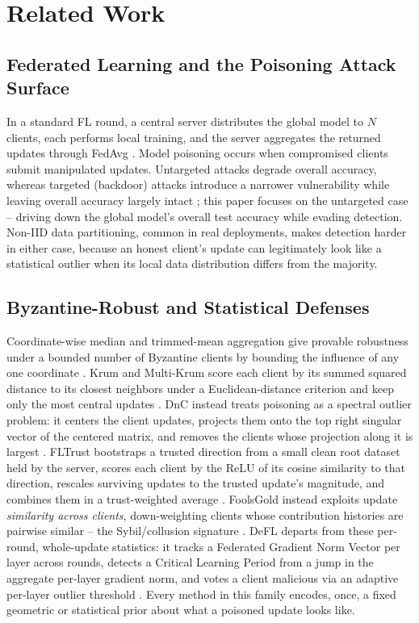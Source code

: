\documentclass[conference]{IEEEtran}
\begin{document}
\section{Related Work}
\label{sec:related}

\subsection{Federated Learning and the Poisoning Attack Surface}
In a standard FL round, a central server distributes the global model to $N$ clients, each performs local training, and the server aggregates the returned updates through FedAvg \cite{fedavg}. Model poisoning occurs when compromised clients submit manipulated updates. Untargeted attacks degrade overall accuracy, whereas targeted (backdoor) attacks introduce a narrower vulnerability while leaving overall accuracy largely intact \cite{bagdasaryan2020}; this paper focuses on the untargeted case -- driving down the global model's overall test accuracy while evading detection. Non-IID data partitioning, common in real deployments, makes detection harder in either case, because an honest client's update can legitimately look like a statistical outlier when its local data distribution differs from the majority.

\subsection{Byzantine-Robust and Statistical Defenses}
Coordinate-wise median and trimmed-mean aggregation give provable robustness under a bounded number of Byzantine clients by bounding the influence of any one coordinate \cite{byzantine}. Krum and Multi-Krum score each client by its summed squared distance to its closest neighbors under a Euclidean-distance criterion and keep only the most central updates \cite{krum}. DnC instead treats poisoning as a spectral outlier problem: it centers the client updates, projects them onto the top right singular vector of the centered matrix, and removes the clients whose projection along it is largest \cite{dnc}. FLTrust bootstraps a trusted direction from a small clean root dataset held by the server, scores each client by the ReLU of its cosine similarity to that direction, rescales surviving updates to the trusted update's magnitude, and combines them in a trust-weighted average \cite{fltrust}. FoolsGold instead exploits update \emph{similarity across clients}, down-weighting clients whose contribution histories are pairwise similar -- the Sybil/collusion signature \cite{foolsgold}. DeFL departs from these per-round, whole-update statistics: it tracks a Federated Gradient Norm Vector per layer across rounds, detects a Critical Learning Period from a jump in the aggregate per-layer gradient norm, and votes a client malicious via an adaptive per-layer outlier threshold \cite{defl}. Every method in this family encodes, once, a fixed geometric or statistical prior about what a poisoned update looks like.
\end{document}
